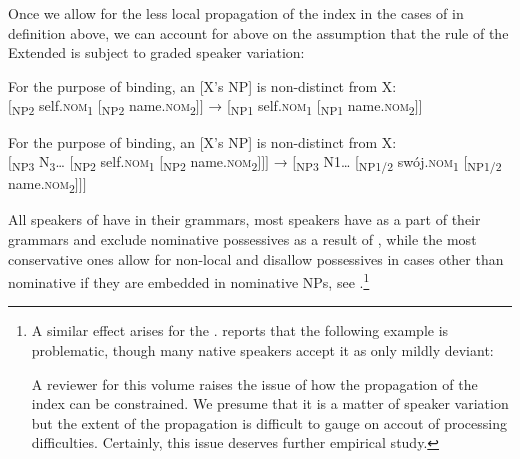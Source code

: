 \documentclass[output=paper,nonflat,colorlinks,citecolor=brown,newtxmath]{langsci/langscibook}
\begin{document}
Once we allow for the less local propagation of the index in the cases of  in definition  above, we can account for  above on the assumption that the rule of the Extended  is subject to graded speaker variation:

\z

\ea \label{ex:witkos:66}
For the purpose of binding, an  [X’s NP] is non-distinct from X:\\
$[$\textsubscript{NP2} self.\textsc{nom}\textsubscript{1} [\textsubscript{NP2} name.\textsc{nom}\textsubscript{2}$]]$ → [\textsubscript{NP1} self.\textsc{nom}\textsubscript{1} [\textsubscript{NP1} name.\textsc{nom}\textsubscript{2}$]]$\\
\z

\ea \label{ex:witkos:67}
For the purpose of binding, an  [X’s NP] is non-distinct from X:\\
$[$\textsubscript{NP3} N\textsubscript{3}{\dots} [\textsubscript{NP2} self.\textsc{nom}\textsubscript{1} [\textsubscript{NP2} name.\textsc{nom}\textsubscript{2}$]]]$ → [\textsubscript{NP3} N1{\dots} [\textsubscript{NP1/2} swój.\textsc{nom}\textsubscript{1} [\textsubscript{NP1/2} name.\textsc{nom}\textsubscript{2}$]]]$\\
\z

\noindent All speakers of  have  in their grammars, most speakers have  as a part of their grammars and exclude nominative  possessives as a result of , while the most conservative ones allow for non-local  and disallow  possessives in cases other than nominative if they are embedded in nominative NPs, see .\footnote{\label{fn34}A similar effect arises for the . \cite[82]{willim1989} reports that the following example is problematic, though many native speakers accept it as only mildly deviant:

\z

\noindent A reviewer for this volume raises the issue of how the propagation of the index can be constrained. We presume that it is a matter of speaker variation but the extent of the propagation is difficult to gauge on accout of processing difficulties. Certainly, this issue deserves further empirical study.}
\end{document}
